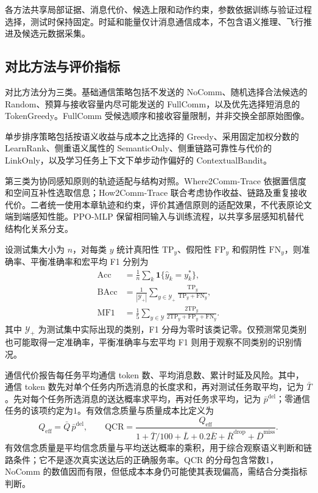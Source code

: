 各方法共享局部证据、消息代价、候选上限和动作约束，参数依据训练与验证过程选择，测试时保持固定。时延和能量仅计消息通信成本，不包含语义推理、飞行推进及候选元数据采集。

\subsection{对比方法与评价指标}
对比方法分为三类。基础通信策略包括不发送的 NoComm、随机选择合法候选的 Random、预算与接收容量内尽可能发送的 FullComm，以及优先选择短消息的 TokenGreedy。FullComm 受候选顺序和接收容量限制，并非交换全部原始图像。

单步排序策略包括按语义收益与成本之比选择的 Greedy、采用固定加权分数的 LearnRank、侧重语义属性的 SemanticOnly、侧重链路可靠性与代价的 LinkOnly，以及学习任务上下文下单步动作偏好的 ContextualBandit。

第三类为协同感知原则的轨迹适配与结构对照。Where2Comm-Trace 依据置信度和空间互补性选取信息；How2Comm-Trace 联合考虑协作收益、链路及重复接收代价\cite{where2comm,how2comm}。二者统一使用本章轨迹和约束，评价其通信原则的适配效果，不代表原论文端到端感知性能。PPO-MLP 保留相同输入与训练流程，以共享多层感知机替代结构化关系分支。

设测试集大小为 $n$，对每类 $y$ 统计真阳性 $\mathrm{TP}_y$、假阳性 $\mathrm{FP}_y$ 和假阴性 $\mathrm{FN}_y$，则准确率、平衡准确率和宏平均 F1 分别为
\begin{equation}
\begin{aligned}
\mathrm{Acc}&=\frac1n\sum_k\mathbf1\{\hat y_k=y_k^*\},\\
\mathrm{BAcc}&=\frac1{|\mathcal Y_+|}\sum_{y\in\mathcal Y_+}
\frac{\mathrm{TP}_y}{\mathrm{TP}_y+\mathrm{FN}_y},\\
\mathrm{MF1}&=\frac15\sum_{y\in\mathcal Y}
\frac{2\mathrm{TP}_y}{2\mathrm{TP}_y+\mathrm{FP}_y+\mathrm{FN}_y}.
\end{aligned}
\label{rq2:eq:metrics}
\end{equation}
其中 $\mathcal Y_+$ 为测试集中实际出现的类别，F1 分母为零时该类记零。仅预测常见类别也可能取得一定准确率，平衡准确率与宏平均 F1 则用于观察不同类别的识别情况。

通信代价报告每任务平均通信 token 数、平均消息数、累计时延及风险。其中，通信 token 数先对单个任务内所选消息的长度求和，再对测试任务取平均，记为 $\bar T$。先对每个任务所选消息的送达概率求平均，再对任务求平均，记为 $\bar p^{\mathrm{del}}$；零通信任务的该项约定为1。有效信念质量与质量成本比定义为
\begin{equation}
Q_{\mathrm{eff}}=\bar Q\,\bar p^{\mathrm{del}},\qquad
\mathrm{QCR}=\frac{Q_{\mathrm{eff}}}
{1+\bar T/100+\bar L+0.2\bar E+\bar R^{\mathrm{drop}}+\bar D^{\mathrm{miss}}}.
\label{rq2:eq:qcr}
\end{equation}
有效信念质量是平均信念质量与平均送达概率的乘积，用于综合观察语义判断和链路条件；它不是逐次真实送达后的正确服务率。QCR 的分母包含常数1，NoComm 的数值因而有限，但低成本本身仍可能使其表现偏高，需结合分类指标判断。

